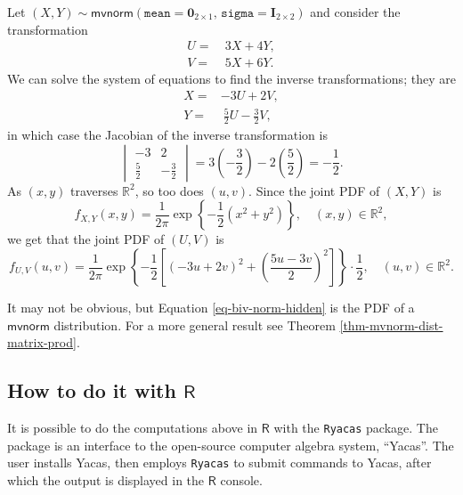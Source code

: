 \documentclass[captions=tableheading]{scrbook}
\begin{document}
\begin{example}
Let \((X,Y)\sim\mathsf{mvnorm}(\mathtt{mean}=\mathbf{0}_{2\times1},\,\mathtt{sigma}=\mathbf{I}_{2\times2})\) and consider the transformation
\begin{align*}
U= & \ 3X+4Y,\\
V= & \ 5X+6Y.
\end{align*}
We can solve the system of equations to find the inverse transformations; they are
\begin{align*}
X= & -3U+2V,\\
Y= & \ \frac{5}{2}U-\frac{3}{2}V,
\end{align*}
in which case the Jacobian of the inverse transformation is
\[
\begin{vmatrix}
-3 & 2\\
\frac{5}{2} & -\frac{3}{2}
\end{vmatrix}
= 3\left(-\frac{3}{2}\right)-2\left(\frac{5}{2}\right) = -\frac{1}{2}.
\]
As \((x,y)\) traverses \(\mathbb{R}^{2}\), so too does \((u,v)\). Since the joint PDF of \((X,Y)\) is
\[
f_{X,Y}(x,y)=\frac{1}{2\pi}\exp\left\{ -\frac{1}{2}\left(x^{2}+y^{2}\right)\right\} ,\quad(x,y)\in\mathbb{R}^{2},
\]
we get that the joint PDF of \((U,V)\) is
\begin{equation}
f_{U,V}(u,v)=\frac{1}{2\pi}\exp\left\{ -\frac{1}{2}\left[\left(-3u+2v\right)^{2}+\left(\frac{5u-3v}{2}\right)^{2}\right]\right\} \cdot\frac{1}{2},\quad(u,v)\in\mathbb{R}^{2}.\label{eq-biv-norm-hidden}
\end{equation}
\end{example}

\begin{rem}
It may not be obvious, but Equation \ref{eq-biv-norm-hidden} is the PDF of a \(\mathsf{mvnorm}\) distribution. For a more general result see Theorem \ref{thm-mvnorm-dist-matrix-prod}.
\end{rem}
\subsection{How to do it with \(\mathsf{R}\)}
\label{sec-7-7-1}
\label{sub-bivariate-transf-R}


It is possible to do the computations above in \(\mathsf{R}\) with the \texttt{Ryacas} package. The package is an interface to the open-source computer algebra system, ``Yacas''. The user installs Yacas, then employs \texttt{Ryacas} to submit commands to Yacas, after which the output is displayed in the \(\mathsf{R}\) console.
\end{document}
